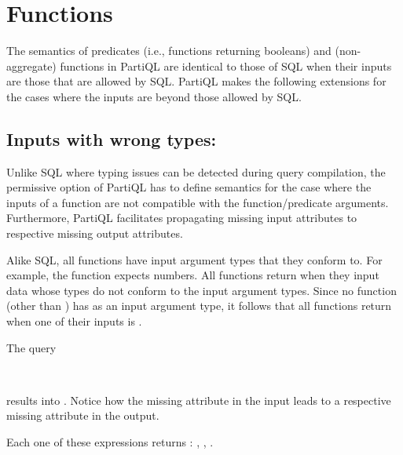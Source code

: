 \section{Functions}
\label{sec:preds-and-fns}

The semantics of predicates (i.e., functions returning booleans) and
(non-aggregate) functions in PartiQL are identical to those of SQL when their
inputs are those that are allowed by SQL. PartiQL makes the following extensions
for the cases where the inputs are beyond those allowed by SQL.
 
\subsection{Inputs with wrong types:}
\label{sec:fns-with-wrong-inputs}


Unlike SQL where typing issues can be detected during query compilation, the
permissive option of PartiQL has to define semantics for the case where the
inputs of a function are not compatible with the function/predicate arguments.
Furthermore, PartiQL facilitates propagating missing input attributes to
respective missing output attributes.

Alike SQL, all functions have input argument types that they conform to. For example, the
function  expects numbers. All functions return \MISSING when they
input data whose types do not conform to the input argument types. Since no
function (other than ) has \MISSING as an input argument
type, it follows that all functions return \MISSING when one of their inputs
is \MISSING.

\begin{example} 
\label{xmpl:missing-on-wrong-types}

The query

\begin{tabbing}
\\
\end{tabbing}

\noindent results into . Notice how the
missing  attribute in the input leads to a respective missing attribute in
the output.
\end{example}

\begin{example}
Each one of these expressions returns \MISSING: , , .
\end{example}

